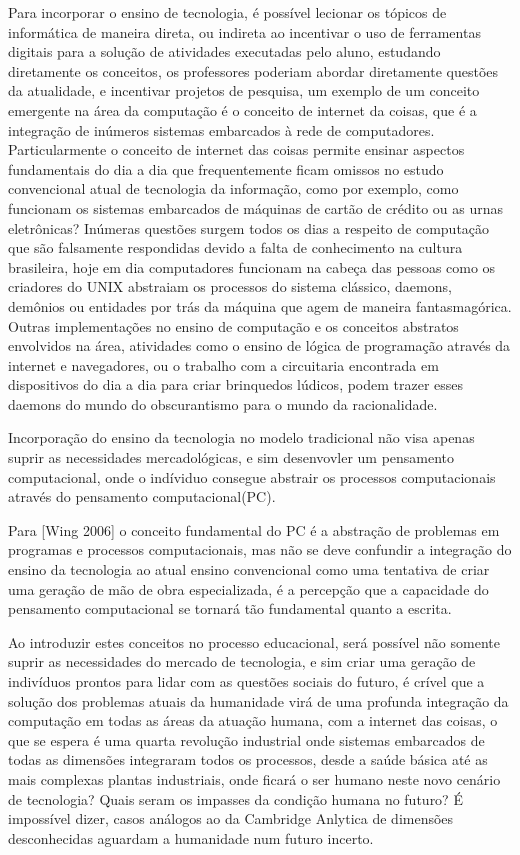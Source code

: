 \documentclass[article, 11pt, oneside, a4paper, english, brazil, sumario=tradicional]{abntex2}
\begin{document}
    Para incorporar o ensino de tecnologia, é possível lecionar os tópicos de informática de maneira direta, ou indireta
ao incentivar o uso de ferramentas digitais para a solução de atividades executadas
pelo aluno, estudando diretamente os conceitos, os professores poderiam abordar
diretamente questões da atualidade, e incentivar projetos de pesquisa, um
exemplo de um conceito emergente na área da computação é o conceito de internet
da coisas, que é a integração de inúmeros sistemas embarcados à rede de computadores.
    Particularmente o conceito de internet das coisas permite ensinar
aspectos fundamentais do dia a dia que frequentemente ficam omissos no estudo
convencional atual de tecnologia da informação, como por exemplo, como funcionam
os sistemas embarcados de máquinas de cartão de crédito ou as urnas eletrônicas?
Inúmeras questões surgem todos os dias a respeito de computação que são
falsamente respondidas devido a falta de conhecimento na cultura brasileira,
hoje em dia computadores funcionam  na cabeça das pessoas como os criadores do
UNIX abstraiam os processos do sistema clássico, daemons, demônios ou entidades
por trás da máquina que agem de maneira fantasmagórica.  Outras implementações
no ensino de computação e os conceitos abstratos envolvidos na área, atividades
como o ensino de lógica de programação através da internet e navegadores, ou o
trabalho com a circuitaria encontrada em dispositivos do dia a dia para criar
brinquedos lúdicos, podem trazer esses daemons do mundo do obscurantismo para o
mundo da racionalidade.

    Incorporação do ensino da tecnologia no modelo tradicional não visa apenas suprir
as necessidades mercadológicas, e sim desenvovler um pensamento computacional, onde o indíviduo
consegue abstrair os processos computacionais através do pensamento computacional(PC).

    Para [Wing 2006] o conceito fundamental do PC é a abstração
de problemas em programas e processos computacionais, mas não se deve confundir a integração
do ensino da tecnologia ao atual ensino convencional como uma tentativa de criar uma geração
de mão de obra especializada, é a percepção que a capacidade do pensamento computacional se tornará
tão fundamental quanto a escrita.

    Ao introduzir estes conceitos no processo educacional, será possível não somente
suprir as necessidades do mercado de tecnologia, e sim criar uma geração de indivíduos
prontos para lidar com as questões sociais do futuro, é crível que a solução dos problemas
atuais da humanidade virá de uma profunda integração da computação em todas as áreas da atuação
humana, com a internet das coisas, o que se espera é uma quarta revolução industrial onde
sistemas embarcados de todas as dimensões integraram todos os processos, desde a saúde
básica até as mais complexas plantas industriais, onde ficará o ser humano neste novo cenário
de tecnologia? Quais seram os impasses da condição humana no futuro? É impossível dizer,
casos análogos ao da Cambridge Anlytica de dimensões desconhecidas aguardam a humanidade
num futuro incerto.
\end{document}
